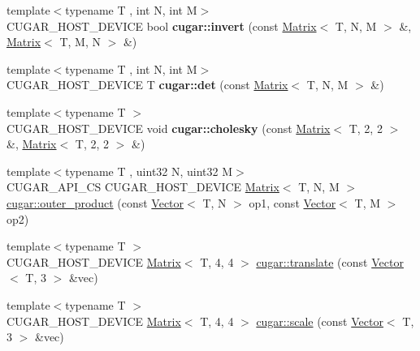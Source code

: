 \begin{DoxyCompactItemize}
\item 
\mbox{\label{group___matrices_module_ga20d4b95c864891a2db0374531dca13a0}} 
{\footnotesize template$<$typename T , int N, int M$>$ }\\C\+U\+G\+A\+R\+\_\+\+H\+O\+S\+T\+\_\+\+D\+E\+V\+I\+CE bool {\bfseries cugar\+::invert} (const \hyperlink{structcugar_1_1_matrix}{Matrix}$<$ T, N, M $>$ \&, \hyperlink{structcugar_1_1_matrix}{Matrix}$<$ T, M, N $>$ \&)
\item 
\mbox{\label{group___matrices_module_ga82f338649a9c229147c15f4d2f8659cd}} 
{\footnotesize template$<$typename T , int N, int M$>$ }\\C\+U\+G\+A\+R\+\_\+\+H\+O\+S\+T\+\_\+\+D\+E\+V\+I\+CE T {\bfseries cugar\+::det} (const \hyperlink{structcugar_1_1_matrix}{Matrix}$<$ T, N, M $>$ \&)
\item 
\mbox{\label{group___matrices_module_gac2a27a33c920ba77146d8ac113a53646}} 
{\footnotesize template$<$typename T $>$ }\\C\+U\+G\+A\+R\+\_\+\+H\+O\+S\+T\+\_\+\+D\+E\+V\+I\+CE void {\bfseries cugar\+::cholesky} (const \hyperlink{structcugar_1_1_matrix}{Matrix}$<$ T, 2, 2 $>$ \&, \hyperlink{structcugar_1_1_matrix}{Matrix}$<$ T, 2, 2 $>$ \&)
\item 
{\footnotesize template$<$typename T , uint32 N, uint32 M$>$ }\\C\+U\+G\+A\+R\+\_\+\+A\+P\+I\+\_\+\+CS C\+U\+G\+A\+R\+\_\+\+H\+O\+S\+T\+\_\+\+D\+E\+V\+I\+CE \hyperlink{structcugar_1_1_matrix}{Matrix}$<$ T, N, M $>$ \hyperlink{group___matrices_module_gaa66a675f08bbed306058f6074b21f57d}{cugar\+::outer\+\_\+product} (const \hyperlink{structcugar_1_1_vector}{Vector}$<$ T, N $>$ op1, const \hyperlink{structcugar_1_1_vector}{Vector}$<$ T, M $>$ op2)
\item 
{\footnotesize template$<$typename T $>$ }\\C\+U\+G\+A\+R\+\_\+\+H\+O\+S\+T\+\_\+\+D\+E\+V\+I\+CE \hyperlink{structcugar_1_1_matrix}{Matrix}$<$ T, 4, 4 $>$ \hyperlink{group___matrices_module_ga85a3c0cf9bdf6ef3fc3f957499b875e1}{cugar\+::translate} (const \hyperlink{structcugar_1_1_vector}{Vector}$<$ T, 3 $>$ \&vec)
\item 
{\footnotesize template$<$typename T $>$ }\\C\+U\+G\+A\+R\+\_\+\+H\+O\+S\+T\+\_\+\+D\+E\+V\+I\+CE \hyperlink{structcugar_1_1_matrix}{Matrix}$<$ T, 4, 4 $>$ \hyperlink{group___matrices_module_ga44968c79fbae587c1dfff598307b623e}{cugar\+::scale} (const \hyperlink{structcugar_1_1_vector}{Vector}$<$ T, 3 $>$ \&vec)

\end{DoxyCompactItemize}
